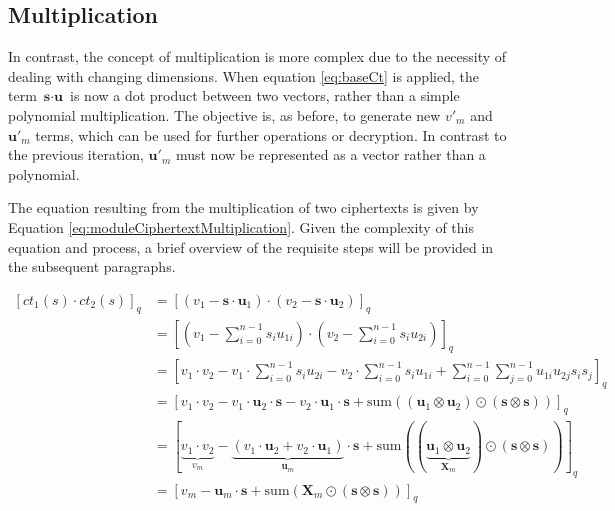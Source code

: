 \subsection*{Multiplication}

In contrast, the concept of multiplication is more complex due to the necessity of dealing with changing dimensions. When equation \ref{eq:baseCt} is applied, the term $\textbf{s}\cdot \textbf{u}$ is now a dot product between two vectors, rather than a simple polynomial multiplication. The objective is, as before, to generate new $v'_m$ and $\textbf{u}'_m$ terms, which can be used for further operations or decryption. In contrast to the previous iteration, $\textbf{u}'_m$ must now be represented as a vector rather than a polynomial.

The equation resulting from the multiplication of two ciphertexts is given by Equation \ref{eq:moduleCiphertextMultiplication}. Given the complexity of this equation and process, a brief overview of the requisite steps will be provided in the subsequent paragraphs.

\begin{equation}
  \begin{split}
    [ct_1(s)\cdot ct_2(s)]_q & = [(v_1-\textbf{s}\cdot \textbf{u}_1) \cdot (v_2-\textbf{s}\cdot \textbf{u}_2)]_q                                                                                                                                                                       \\
                             & = [(v_1-\sum_{i=0}^{n-1}s_iu_{1i}) \cdot (v_2-\sum_{i=0}^{n-1}s_iu_{2i})]_q                                                                                                                                                                             \\
                             & = [v_1\cdot v_2 - v_1\cdot \sum_{i=0}^{n-1}s_iu_{2i}- v_2\cdot \sum_{i=0}^{n-1}s_iu_{1i} + \sum_{i=0}^{n-1}\sum_{j=0}^{n-1}u_{1i}u_{2j}s_is_j]_q                                                                                                        \\    
                             & = [v_1\cdot v_2 - v_1\cdot \textbf{u}_2\cdot \textbf{s} - v_2\cdot \textbf{u}_1\cdot \textbf{s} + \mathrm{sum}((\textbf{u}_{1}\otimes\textbf{u}_{2})\odot(\textbf{s}\otimes\textbf{s}))]_q                                                              \\
                             & = [\underbrace{v_1\cdot v_2}_{v_m} - \underbrace{(v_1\cdot \textbf{u}_2 + v_2\cdot \textbf{u}_1)}_{\textbf{u}_m}\cdot \textbf{s} + \mathrm{sum}((\underbrace{\textbf{u}_{1}\otimes\textbf{u}_{2}}_{\textbf{X}_m})\odot(\textbf{s}\otimes\textbf{s}))]_q \\
                             & = [v_m - \textbf{u}_m\cdot \textbf{s} + \mathrm{sum}(\textbf{X}_m\odot(\textbf{s}\otimes\textbf{s}))]_q
  \end{split}
  \label{eq:moduleCiphertextMultiplication}
\end{equation}


